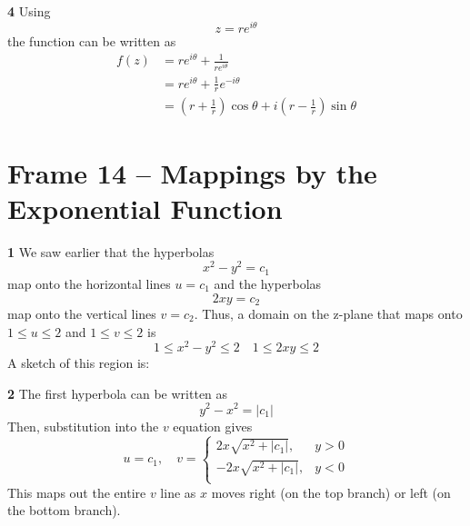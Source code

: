 \documentclass{article}
\begin{document}
\textbf{4}
Using
\[
	z = re^{i\theta}
\]
the function can be written as
\begin{align*}
	f(z) &= re^{i\theta} + \frac{1}{re^{i\theta}} \\
	&= re^{i\theta} + \frac{1}{r} e^{-i\theta} \\
	&= (r + \frac{1}{r}) \cos \theta + i(r - \frac{1}{r}) \sin \theta
\end{align*}


\clearpage
\section{Frame 14 -- Mappings by the Exponential Function}
\textbf{1}
We saw earlier that the hyperbolas
\[
	x^2 - y^2 = c_1
\]
map onto the horizontal lines $u = c_1$ and the hyperbolas
\[
	2xy = c_2
\]
map onto the vertical lines $v = c_2$. Thus, a domain on the z-plane that maps onto $1 \le u \le 2$ and $1 \le v \le 2$ is
\[
	1 \le x^2 - y^2 \le 2	\quad	1 \le 2xy \le 2
\]
A sketch of this region is:
\begin{center}
\end{center}


\textbf{2}
The first hyperbola can be written as
\[
	y^2 - x^2 = |c_1|
\]
Then, substitution into the $v$ equation gives
\[
	u = c_1, \quad	v = \begin{cases}
		 2x \sqrt{x^2 + |c_1|},	& y > 0 \\
		-2x \sqrt{x^2 + |c_1|},	& y < 0 \\
	\end{cases}
\]
This maps out the entire $v$ line as $x$ moves right (on the top branch) or left (on the bottom branch).
\end{document}
